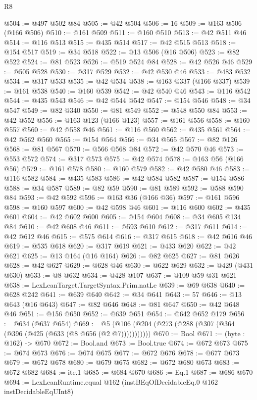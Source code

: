 \begin{lexlean}{R8}
\begin{coremodule}
@504 := @497 @502 @84
@505 := @42 @504
@506 := 16
@509 := @163 @506 (@166 @506)
@510 := @161 @509
@511 := @160 @510
@513 := @42 @511 @46
@514 := @116 @513
@515 := @435 @514
@517 := @42 @515 @513
@518 := @154 @517
@519 := @34 @518
@522 := @13 @506 (@16 @506)
@523 := @82 @522
@524 := @81 @523
@526 := @519 @524 @84
@528 := @42 @526 @46
@529 := @505 @528
@530 := @317 @529
@532 := @42 @530 @46
@533 := @483 @532
@534 := @317 @533
@535 := @42 @534
@538 := @163 @337 (@166 @337)
@539 := @161 @538
@540 := @160 @539
@542 := @42 @540 @46
@543 := @116 @542
@544 := @435 @543
@546 := @42 @544 @542
@547 := @154 @546
@548 := @34 @547
@549 := @82 @340
@550 := @81 @549
@552 := @548 @550 @84
@553 := @42 @552
@556 := @163 @123 (@166 @123)
@557 := @161 @556
@558 := @160 @557
@560 := @42 @558 @46
@561 := @116 @560
@562 := @435 @561
@564 := @42 @562 @560
@565 := @154 @564
@566 := @34 @565
@567 := @82 @126
@568 := @81 @567
@570 := @566 @568 @84
@572 := @42 @570 @46
@573 := @553 @572
@574 := @317 @573
@575 := @42 @574
@578 := @163 @56 (@166 @56)
@579 := @161 @578
@580 := @160 @579
@582 := @42 @580 @46
@583 := @116 @582
@584 := @435 @583
@586 := @42 @584 @582
@587 := @154 @586
@588 := @34 @587
@589 := @82 @59
@590 := @81 @589
@592 := @588 @590 @84
@593 := @42 @592
@596 := @163 @36 (@166 @36)
@597 := @161 @596
@598 := @160 @597
@600 := @42 @598 @46
@601 := @116 @600
@602 := @435 @601
@604 := @42 @602 @600
@605 := @154 @604
@608 := @34 @605 @134 @84
@610 := @42 @608 @46
@611 := @593 @610
@612 := @317 @611
@614 := @42 @612 @46
@615 := @575 @614
@616 := @317 @615
@618 := @42 @616 @46
@619 := @535 @618
@620 := @317 @619
@621 := @433 @620
@622 := @42 @621
@625 := @13 @164 (@16 @164)
@626 := @82 @625
@627 := @81 @626
@628 := @42 @627
@629 := @628 @46
@630 := @622 @629
@632 := @429 (@431 @630)
@633 := @8 @632
@634 := @428 @107
@637 := @109 @59 @31 @621
@638 := LexLeanTarget.TargetSyntax.Prim.natLe
@639 := @69 @638
@640 := @628 @242
@641 := @639 @640
@642 := @34 @641
@643 := 57
@646 := @13 @643 (@16 @643)
@647 := @82 @646
@648 := @81 @647
@650 := @42 @648 @46
@651 := @156 @650
@652 := @639 @651
@654 := @642 @652 @179
@656 := @634 (@637 @654)
@669 := @5 (@106 (@204 (@273 (@288 (@307 (@364 (@396 (@425 (@633 (@8 @656 (@2 @7)))))))))))
@670 := Bool
@671 := (byte : @162) -> @670
@672 := Bool.and
@673 := Bool.true
@674 := @672 @673
@675 := @674 @673
@676 := @674 @675
@677 := @672 @676
@678 := @677 @673
@679 := @672 @678
@680 := @679 @675
@682 := @672 @680 @673
@683 := @672 @682
@684 := ite.{1}
@685 := @684 @670
@686 := Eq.{1}
@687 := @686 @670
@694 := LexLeanRuntime.equal @162 (instBEqOfDecidableEq.{0} @162 instDecidableEqUInt8)

\end{coremodule}
\end{lexlean}
